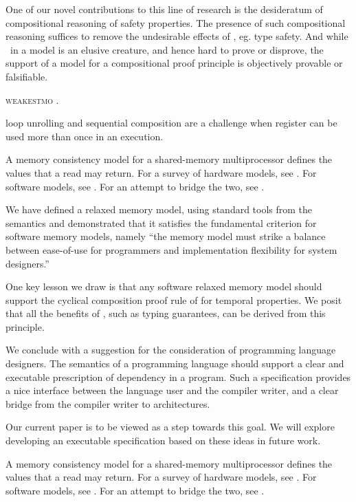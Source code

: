 One of our novel contributions to this line of research is the desideratum of
compositional reasoning of safety properties. The presence of such
compositional reasoning suffices to remove the undesirable effects of \oota,
eg. type safety.  And while \oota\ in a model is an elusive creature, and
hence hard to prove or disprove, the support of a model for a compositional
proof principle is objectively provable or falsifiable.


\textsc{weakestmo} \cite{DBLP:journals/pacmpl/ChakrabortyV19, DBLP:journals/corr/abs-1911-06567}.

loop unrolling and sequential composition are a challenge when register can be
used more than once in an execution.

A memory consistency model for a shared-memory multiprocessor defines the
values that a read may return.  For a survey of hardware models, see
\citep{AlglaveThesis}. For software models, see
\citep{DBLP:journals/toplas/Lochbihler13,DBLP:phd/ethos/Batty15}.  For an
attempt to bridge the two, see \citep{DBLP:journals/pacmpl/PodkopaevLV19}.

We have defined a relaxed memory model, using standard tools from the
semantics and demonstrated that it satisfies the fundamental criterion for
software memory models, namely ``the memory model must strike a balance
between ease-of-use for programmers and implementation flexibility for system
designers.''

One key lesson we draw is that any software relaxed memory model should
support the cyclical composition proof rule of
\citet{Abadi:1993:CS:151646.151649} for temporal properties.  We posit that all
the benefits of \oota, such as typing guarantees, can be derived from this
principle. 

We conclude with a suggestion for the consideration of programming language
designers.  The semantics of a programming language should support a clear
and executable prescription of dependency in a program.  Such a specification
provides a nice interface between the language user and the compiler writer,
and a clear bridge from the compiler writer to architectures.

Our current paper is to be viewed as a step towards this goal.  We will
explore developing an executable specification based on these ideas in future
work.

A memory consistency model for a shared-memory multiprocessor defines the
values that a read may return.  For a survey of hardware models, see
\citep{AlglaveThesis}. For software models, see
\citep{DBLP:journals/toplas/Lochbihler13,DBLP:phd/ethos/Batty15}.  For an
attempt to bridge the two, see \citep{DBLP:journals/pacmpl/PodkopaevLV19}.

